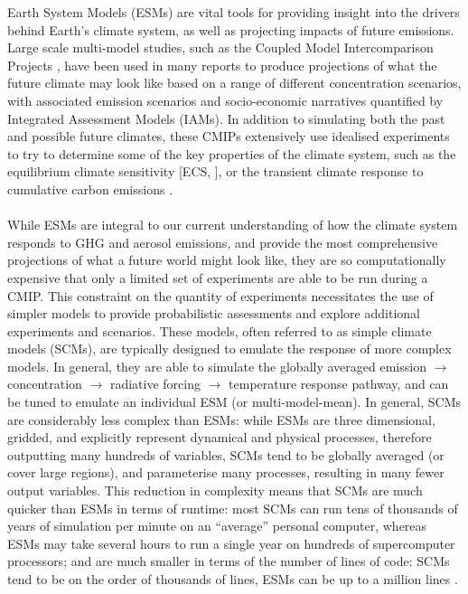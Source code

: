 \documentclass[gmd, manuscript]{copernicus}
\begin{document}
\introduction \label{introduction}
Earth System Models (ESMs) are vital tools for providing insight into the drivers behind Earth’s climate system, as well as projecting impacts of future emissions. Large scale multi-model studies, such as the Coupled Model Intercomparison Projects \citep[CMIPs]{Eyring2016,Taylor2012}, have been used in many reports to produce projections of what the future climate may look like based on a range of different concentration scenarios, with associated emission scenarios and socio-economic narratives quantified by Integrated Assessment Models (IAMs). In addition to simulating both the past and possible future climates, these CMIPs extensively use idealised experiments to try to determine some of the key properties of the climate system, such as the equilibrium climate sensitivity [ECS, \cite{Collins2013}], or the transient climate response to cumulative carbon emissions \citep[TCRE]{Allen2009}.\\\\ 
%
While ESMs are integral to our current understanding of how the climate system responds to GHG and aerosol emissions, and provide the most comprehensive projections of what a future world might look like, they are so computationally expensive that only a limited set of experiments are able to be run during a CMIP. This constraint on the quantity of experiments necessitates the use of simpler models to provide probabilistic assessments and explore additional experiments and scenarios. These models, often referred to as simple climate models (SCMs), are typically designed to emulate the response of more complex models. In general, they are able to simulate the globally averaged emission $\rightarrow$ concentration $\rightarrow$ radiative forcing $\rightarrow$ temperature response pathway, and can be tuned to emulate an individual ESM (or multi-model-mean). In general, SCMs are considerably less complex than ESMs: while ESMs are three dimensional, gridded, and explicitly represent dynamical and physical processes, therefore outputting many hundreds of variables, SCMs tend to be globally averaged (or cover large regions), and parameterise many processes, resulting in many fewer output variables. This reduction in complexity means that SCMs are much quicker than ESMs in terms of runtime: most SCMs can run tens of thousands of years of simulation per minute on an ``average'' personal computer, whereas ESMs may take several hours to run a single year on hundreds of supercomputer processors; and are much smaller in terms of the number of lines of code: SCMs tend to be on the order of thousands of lines, ESMs can be up to a million lines \citep{Alexander2015}.\\\\
\end{document}

